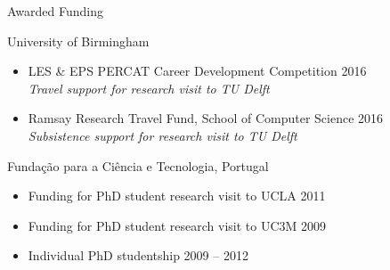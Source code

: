 \begin{rSection}{Awarded Funding}
\item University of Birmingham

\begin{itemize}
\item  LES \& EPS PERCAT Career Development Competition \hfill 2016 \\
\textit{ Travel support for research visit to TU Delft}

\item Ramsay Research Travel Fund, School of Computer Science \hfill 2016\\
\textit{ Subsistence support for research visit to TU Delft} 
\end{itemize}

\item Funda\c{c}\~{a}o para a Ci\^{e}ncia e Tecnologia, Portugal
\begin{itemize}

\item Funding for PhD student research visit to UCLA \hfill 2011

\item Funding for PhD student research visit to UC3M \hfill 2009

\item Individual PhD studentship  \hfill  2009 -- 2012
\end{itemize}

\end{rSection}
